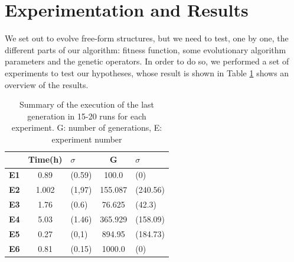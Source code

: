 \documentclass[sigconf]{acmart}
\newcommand{\myfloatalign}{\centering} %
\begin{document}
\section{Experimentation and Results}\label{ch:res}

We set out to evolve free-form structures, but we need to test, one by
one, the different parts of our algorithm: fitness function, some
evolutionary algorithm parameters and the genetic operators. In order
to do so, we performed a set of experiments to test our hypotheses,
whose result is shown in Table \ref{t:resOver1} shows an overview of the 
results. 

\begin{table}
	\myfloatalign
	\begin{tabular}{cclcl}
		& \textbf{Time(h)} &$\sigma$ & \textbf{G}& $\sigma$ \\ \hline
		\textbf{E1}&0.89&(0.59)&100.0&(0)\\  \hline
		\textbf{E2}&1.002&(1,97)&155.087&(240.56) \\  \hline
		\textbf{E3}&1.76&(0.6)&76.625&(42.3)\\  \hline
		\textbf{E4}&5.03&(1.46)&365.929&(158.09)  \\  \hline
		\textbf{E5}&0.27&(0,1)&894.95&(184.73)     \\  \hline 
		\textbf{E6}&0.81&(0.15)&1000.0&(0) \\  \hline
		\hline
	\end{tabular}
	\caption{Summary of the execution of the last generation in 15-20 runs for 
	each
		experiment.
		G: number of generations, E: experiment 
		number} %
	\label{t:resOver1}
\end{table}
\end{document}
